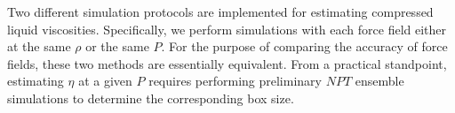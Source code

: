 \documentclass[preprint,review,12pt]{elsarticle}
\begin{document}
%	
	
	Two different simulation protocols are implemented for estimating compressed liquid viscosities. Specifically, we perform simulations with each force field either at the same $\rho$ or the same $P$. For the purpose of comparing the accuracy of force fields, these two methods are essentially equivalent. From a practical standpoint, estimating $\eta$ at a given $P$ requires performing preliminary $NPT$ ensemble simulations to determine the corresponding box size.
	
	
%	 
	
\end{document}
